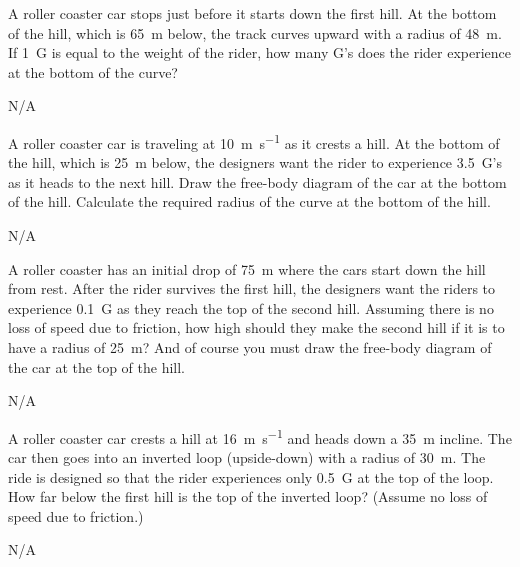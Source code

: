 



\begin{question}[ID=centripetal-A-Q01,topic=circular-motion,difficulty=A]
    A roller coaster car stops just before it starts down the first hill.
    At the bottom of the hill, which is \SI{65}{\meter} below, the 
        track curves upward with a radius of \SI{48}{\meter}.
    If \SI{1}{G} is equal to the weight of the rider, how many G's
        does the rider experience at the bottom of the curve?
\end{question}
\begin{solution}
    N/A
\end{solution}


\begin{question}[ID=centripetal-A-Q02,topic=circular-motion,difficulty=A]
    A roller coaster car is traveling at \SI{10}{\meter\per\second}
        as it crests a hill.
    At the bottom of the hill, which is \SI{25}{\meter} below,
        the designers want the rider to experience \SI{3.5}{G}'s as
        it heads to the next hill.
    Draw the free-body diagram of the car at the bottom of the hill.
    Calculate the required radius of the curve at the bottom of the hill.
\end{question}
\begin{solution}
    N/A
\end{solution}


\begin{question}[ID=centripetal-A-Q03,topic=circular-motion,difficulty=A]
    A roller coaster has an initial drop of \SI{75}{\meter}
        where the cars start down the hill from rest.
    After the rider survives the first hill, the designers
        want the riders to experience \SI{0.1}{G} as they
        reach the top of the second hill.
    Assuming there is no loss of speed due to friction,
        how high should they make the second hill if it
        is to have a radius of \SI{25}{\meter}?
    And of course you must draw the free-body diagram of
        the car at the top of the hill.
\end{question}
\begin{solution}
    N/A
\end{solution}



\begin{question}[ID=centripetal-A-Q04,topic=circular-motion,difficulty=A]
    A roller coaster car crests a hill at \SI{16}{\meter\per\second}
        and heads down a \SI{35}{\meter} incline.
    The car then goes into an inverted loop (upside-down) with a
        radius of \SI{30}{\meter}.
    The ride is designed so that the rider experiences only
        \SI{0.5}{G} at the top of the loop.
    How far below the first hill is the top of the inverted loop?
    (Assume no loss of speed due to friction.)
\end{question}
\begin{solution}
    N/A
\end{solution}


